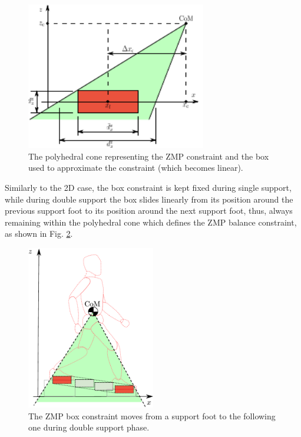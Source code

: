 \begin{figure}
    \centering
    \includegraphics[width=0.7\textwidth]{figures/polyhedral-cone-side-view.pdf}
    \caption{The polyhedral cone representing the ZMP constraint and the 
        box used to approximate the constraint (which becomes linear).}
    \label{fig:polyhedral-cone-side-view}
\end{figure}
Similarly to the 2D case, the box constraint is kept fixed during
single support, while during double support the box 
slides linearly from its position around the previous support foot to its 
position around the next support foot, thus, always remaining within the 
polyhedral cone which defines the ZMP balance constraint, as shown in Fig.
\ref{fig:double-support3D}.
\begin{figure}
    \centering
    \includegraphics[width=0.5\textwidth]{figures/double_support3D.pdf}
    \caption{The ZMP box constraint moves from a support foot to the following 
        one during double support phase.}
    \label{fig:double-support3D}
\end{figure}
